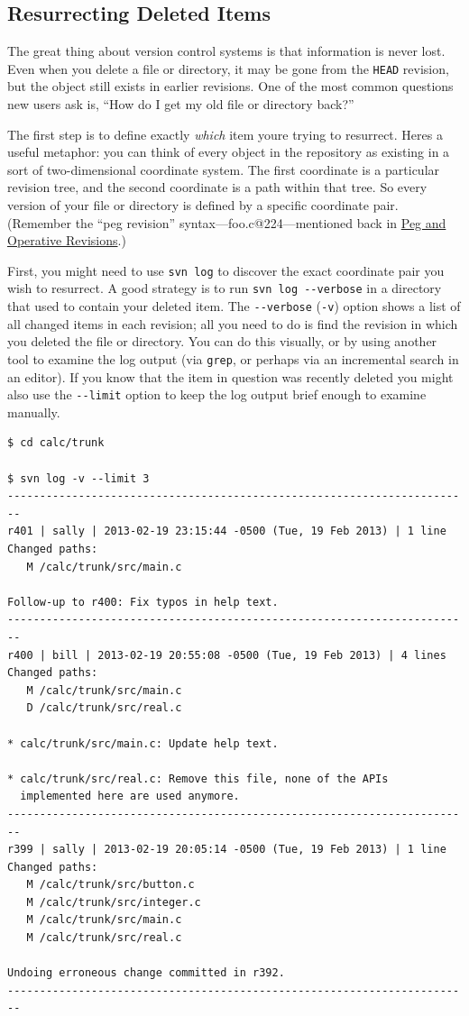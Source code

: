\subsection{Resurrecting Deleted
Items}\label{svn.branchmerge.basicmerging.resurrect}

The great thing about version control systems is that information is
never lost. Even when you delete a file or directory, it may be gone
from the \texttt{HEAD} revision, but the object still exists in earlier
revisions. One of the most common questions new users ask is, ``How do I
get my old file or directory back?''

The first step is to define exactly \emph{which} item
you\textquotesingle re trying to resurrect. Here\textquotesingle s a
useful metaphor: you can think of every object in the repository as
existing in a sort of two-dimensional coordinate system. The first
coordinate is a particular revision tree, and the second coordinate is a
path within that tree. So every version of your file or directory is
defined by a specific coordinate pair. (Remember the ``peg revision''
syntax---foo.c@224---mentioned back in
\hyperref[svn.advanced.pegrevs]{Peg and Operative Revisions}.)

First, you might need to use \texttt{svn\ log} to discover the exact
coordinate pair you wish to resurrect. A good strategy is to run
\texttt{svn\ log\ -\/-verbose} in a directory that used to contain your
deleted item. The \texttt{-\/-verbose} (\texttt{-v}) option shows a list
of all changed items in each revision; all you need to do is find the
revision in which you deleted the file or directory. You can do this
visually, or by using another tool to examine the log output (via
\texttt{grep}, or perhaps via an incremental search in an editor). If
you know that the item in question was recently deleted you might also
use the \texttt{-\/-limit} option to keep the log output brief enough to
examine manually.

\begin{verbatim}
$ cd calc/trunk

$ svn log -v --limit 3
------------------------------------------------------------------------
r401 | sally | 2013-02-19 23:15:44 -0500 (Tue, 19 Feb 2013) | 1 line
Changed paths:
   M /calc/trunk/src/main.c

Follow-up to r400: Fix typos in help text.
------------------------------------------------------------------------
r400 | bill | 2013-02-19 20:55:08 -0500 (Tue, 19 Feb 2013) | 4 lines
Changed paths:
   M /calc/trunk/src/main.c
   D /calc/trunk/src/real.c

* calc/trunk/src/main.c: Update help text.

* calc/trunk/src/real.c: Remove this file, none of the APIs
  implemented here are used anymore.
------------------------------------------------------------------------
r399 | sally | 2013-02-19 20:05:14 -0500 (Tue, 19 Feb 2013) | 1 line
Changed paths:
   M /calc/trunk/src/button.c
   M /calc/trunk/src/integer.c
   M /calc/trunk/src/main.c
   M /calc/trunk/src/real.c

Undoing erroneous change committed in r392.
------------------------------------------------------------------------
\end{verbatim}

